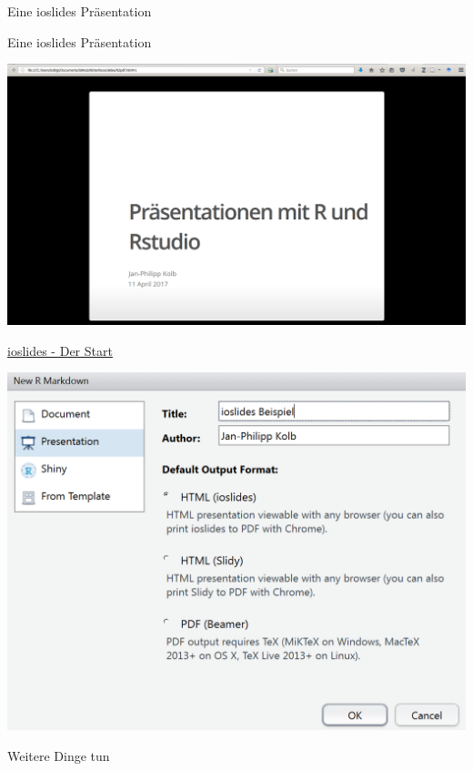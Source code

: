 \documentclass[ignorenonframetext,]{beamer}
\begin{document}
\begin{frame}[fragile]{Eine ioslides Präsentation}

\begin{block}{Eine ioslides Präsentation}

\includegraphics{./tex2pdf.9796/0c27bd4ba04033cf53b90e4da01e03d9d37c70c9.png}

\end{block}

\begin{block}{\href{http://rmarkdown.rstudio.com/ioslides_presentation_format.html}{ioslides
- Der Start}}

\includegraphics{./tex2pdf.9796/7febec5c9b6b0b5ca4f1d8060a7f9b28faff5129.png}

\end{block}

\begin{block}{Weitere Dinge tun}


\end{block}
\end{frame}
\end{document}
